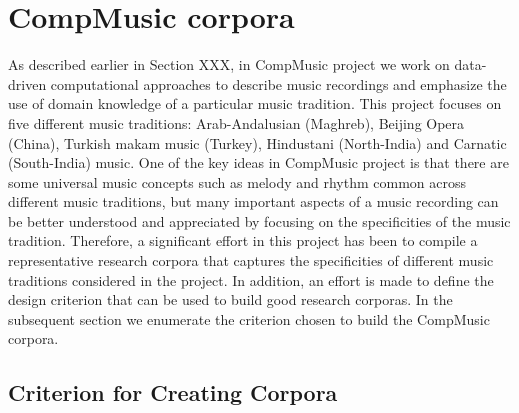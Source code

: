 %


\section{CompMusic corpora}

As described earlier in Section XXX, in CompMusic project we work on data-driven computational approaches to describe music recordings and emphasize the use of domain knowledge of a particular music tradition. This project focuses on five different music traditions: Arab-Andalusian (Maghreb), Beijing Opera (China), Turkish makam music (Turkey), Hindustani (North-India) and Carnatic (South-India) music. One of the key ideas in CompMusic project is that there are some universal music concepts such as melody and rhythm common across different music traditions, but many important aspects of a music recording can be better understood and appreciated by focusing on the specificities of the music tradition. Therefore, a significant effort in this project has been to compile a representative research corpora that captures the specificities of different music traditions considered in the project. In addition, an effort is made to define the design criterion that can be used to build good research corporas. In the subsequent section we enumerate the criterion chosen to build the CompMusic corpora.

\subsection{Criterion for Creating Corpora}
\label{sec:corpus_criterion_for_corpora}

